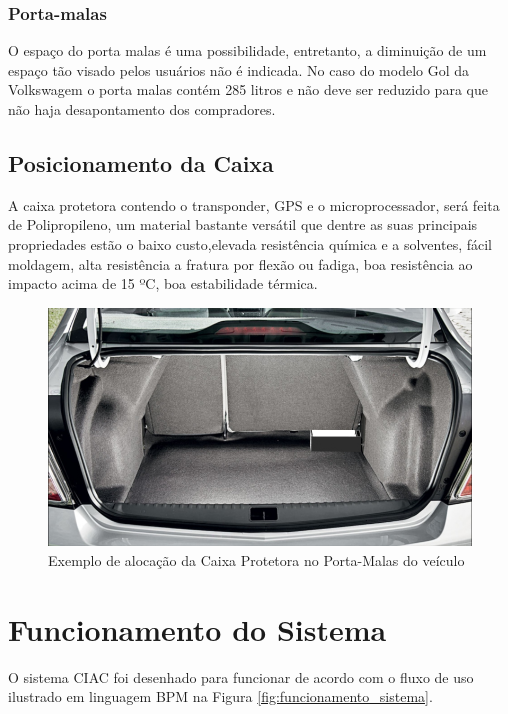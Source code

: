 \subsubsection{Porta-malas}
O espaço do porta malas é uma possibilidade, entretanto, a diminuição de um
espaço tão visado pelos usuários não é indicada. No caso do modelo Gol da
Volkswagem o porta malas contém 285 litros e não deve ser reduzido para que não haja
desapontamento dos compradores.

\subsection{Posicionamento da Caixa}
A caixa protetora contendo o transponder, GPS e o microprocessador, será feita
de Polipropileno, um material bastante versátil que dentre as suas principais
propriedades estão o baixo custo,elevada resistência química e a solventes,
fácil moldagem, alta resistência a fratura por flexão ou fadiga, boa resistência
ao impacto acima de 15 ºC, boa estabilidade térmica.


\begin{figure}[h]
  \centering
  \includegraphics[width=470px, scale=1]{figuras/posicionamento_caixa}
  \caption{Exemplo de alocação da Caixa Protetora no Porta-Malas do veículo}
\label{fig:posicionamento_caixa}
\end{figure}



\section{Funcionamento do Sistema}

O sistema CIAC foi desenhado para funcionar de acordo com o fluxo de uso ilustrado
em linguagem BPM na Figura \ref{fig:funcionamento_sistema}.

